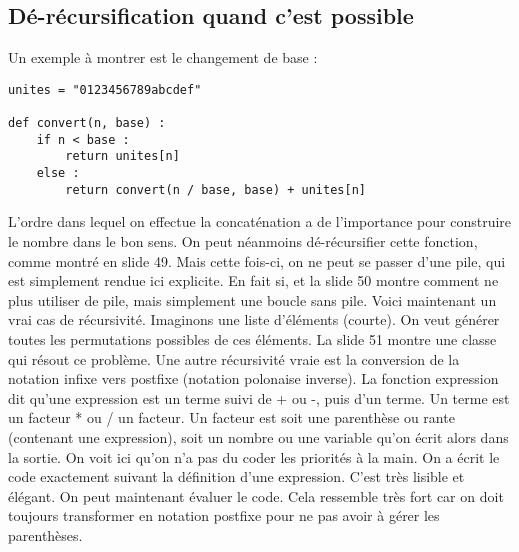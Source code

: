 \documentclass[10pt]{article}
\begin{document}
\subsection{Dé-récursification quand c'est possible} 
Un exemple à montrer est le changement de base : 
\lstset{language=Python}
\lstset{basicstyle=\footnotesize}
\begin{lstlisting}
unites = "0123456789abcdef"

def convert(n, base) : 
	if n < base : 
		return unites[n] 
	else : 
		return convert(n / base, base) + unites[n]
\end{lstlisting}
L'ordre dans lequel on effectue la concaténation a de l'importance pour construire le nombre dans le bon sens. On peut néanmoins dé-récursifier cette fonction, comme montré en slide 49. Mais cette fois-ci, on ne peut se passer d'une pile, qui est simplement rendue ici explicite. En fait si, et la slide 50 montre comment ne plus utiliser de pile, mais simplement une boucle sans pile. 
\newline \newline 
Voici maintenant un vrai cas de récursivité. Imaginons une liste d'éléments (courte). On veut générer toutes les permutations possibles de ces éléments. La slide 51 montre une classe qui résout ce problème.  
\newline {} Une autre récursivité vraie est la conversion de la notation infixe vers postfixe (notation polonaise inverse). La fonction expression dit qu'une expression est un terme suivi de + ou -, puis d'un terme. Un terme est un facteur * ou / un facteur. Un facteur est soit une parenthèse ou rante (contenant une expression), soit un nombre ou une variable qu'on écrit alors dans la sortie. 
\newline \newline 
On voit ici qu'on n'a pas du coder les priorités à la main. On a écrit le code exactement suivant la définition d'une expression. C'est très lisible et élégant. 
\newline \newline 
On peut maintenant évaluer le code. Cela ressemble très fort car on doit toujours transformer en notation postfixe pour ne pas avoir à gérer les parenthèses. 
\end{document}
